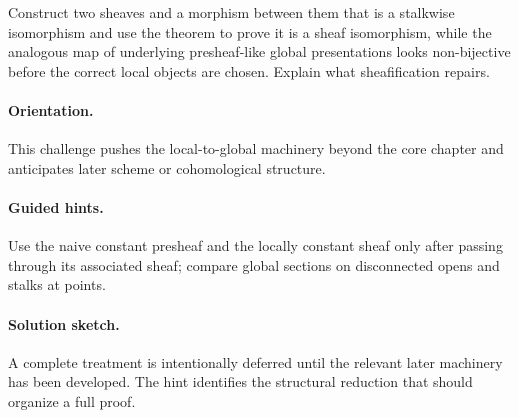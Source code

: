 \begin{problem}
Construct two sheaves and a morphism between them that is a stalkwise isomorphism and use the theorem to prove it is a sheaf isomorphism, while the analogous map of underlying presheaf-like global presentations looks non-bijective before the correct local objects are chosen. Explain what sheafification repairs.
\end{problem}

\ifdefined\FullProblemDossiers
\paragraph{Orientation.}
This challenge pushes the local-to-global machinery beyond the core chapter and anticipates later scheme or cohomological structure.

\paragraph{Guided hints.}
Use the naive constant presheaf and the locally constant sheaf only after passing through its associated sheaf; compare global sections on disconnected opens and stalks at points.

\paragraph{Solution sketch.}
A complete treatment is intentionally deferred until the relevant later machinery has been developed. The hint identifies the structural reduction that should organize a full proof.
\fi

